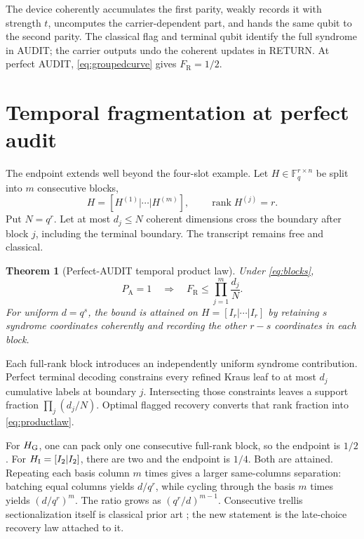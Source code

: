 \documentclass[10pt,twocolumn]{article}
\newtheorem{theorem}{Theorem}[section]
\theoremstyle{remark}
\newcommand{\PA}{P_{\mathrm A}}
\newcommand{\FR}{F_{\mathrm R}}
\begin{document}
The device coherently accumulates the first parity, weakly records it with
strength $t$, uncomputes the carrier-dependent part, and hands the same qubit
to the second parity. The classical flag and terminal qubit identify the full
syndrome in AUDIT; the carrier outputs undo the coherent updates in RETURN.
At perfect AUDIT, \eqref{eq:groupedcurve} gives $\FR=1/2$.

\section{Temporal fragmentation at perfect audit}
\label{sec:endpoint}

The endpoint extends well beyond the four-slot example. Let
$H\in\mathbb F_q^{r\times n}$ be split into $m$ consecutive blocks,
\begin{equation}
H=[H^{(1)}|\cdots|H^{(m)}],\qquad
\operatorname{rank}H^{(j)}=r.
\label{eq:blocks}
\end{equation}
Put $N=q^r$. Let at most $d_j\leq N$ coherent dimensions cross the boundary
after block $j$, including the terminal boundary. The transcript remains
free and classical.

\begin{theorem}[Perfect-AUDIT temporal product law]
Under \eqref{eq:blocks},
\begin{equation}
\PA=1\quad\Longrightarrow\quad
\FR\leq\prod_{j=1}^{m}\frac{d_j}{N}.
\label{eq:productlaw}
\end{equation}
For uniform $d=q^s$, the bound is attained on
$H=[I_r|\cdots|I_r]$ by retaining $s$ syndrome coordinates coherently and
recording the other $r-s$ coordinates in each block.
\end{theorem}

Each full-rank block introduces an independently uniform syndrome
contribution. Perfect terminal decoding constrains every refined Kraus leaf
to at most $d_j$ cumulative labels at boundary $j$. Intersecting those
constraints leaves a support fraction $\prod_j(d_j/N)$. Optimal flagged
recovery converts that rank fraction into \eqref{eq:productlaw}.

For $H_{\rm G}$, one can pack only one consecutive full-rank block, so the
endpoint is $1/2$. For $H_{\rm I}=[I_2|I_2]$, there are two and the endpoint
is $1/4$. Both are attained. Repeating each basis column $m$ times gives a
larger same-columns separation: batching equal columns yields $d/q^r$, while
cycling through the basis $m$ times yields $(d/q^r)^m$. The ratio grows as
$(q^r/d)^{m-1}$. Consecutive trellis sectionalization itself is classical
prior art \cite{lafourcade1996sectionalization}; the new statement is the
late-choice recovery law attached to it.
\end{document}
